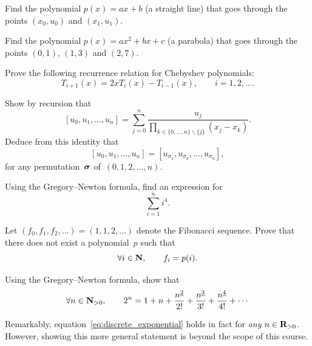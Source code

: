 
\begin{exercise}
    Find the polynomial $p(x) = ax + b$ (a straight line) that goes through the points $(x_0, u_0)$ and $(x_1, u_1)$.
\end{exercise}

\begin{exercise}
    Find the polynomial $p(x) = ax^2 + b x + c$ (a parabola) that goes through the points $(0, 1)$, $(1, 3)$ and $(2, 7)$.
\end{exercise}

\begin{exercise}
    Prove the following recurrence relation for Chebyshev polynomials:
    \[
        T_{i+1}(x) = 2 x T_i(x) - T_{i-1}(x), \qquad i = 1, 2, \dotsc.
    \]
\end{exercise}

\begin{exercise}
    \label{exercise:divided_differences}
    Show by recursion that
    \[
        [u_{0}, u_{1}, \dotsc, u_{n}] = \sum_{j=0}^{n} \frac{u_{j}}{\prod_{ k \in \{0, \dotsc, n\} \backslash \{ j\}} (x_{j} - x_{k})}.
    \]
    Deduce from this identity that
    \[
        [u_{0}, u_{1}, \dotsc, u_{n}] = [u_{\sigma_1}, u_{\sigma_2}, \dotsc, u_{\sigma_n}],
    \]
    for any permutation~$\mathbf{\boldsymbol{\sigma}}$ of~$(0, 1, 2, \dotsc, n)$.
\end{exercise}

\begin{exercise}
    Using the Gregory--Newton formula,
    find an expression for
    \[
        \sum_{i=1}^{n} i^4.
    \]
\end{exercise}

\begin{exercise}
    Let $(f_0, f_1, f_2, \dotsc) = (1, 1, 2, \dotsc)$ denote the Fibonacci sequence.
    Prove that there does not exist a polynomial~$p$ such that
    \[
        \forall i \in \mathbf N, \qquad
        f_i = p(i).
    \]
\end{exercise}

\begin{exercise}
    Using the Gregory--Newton formula,
    show that
    \begin{equation}
        \label{eq:discrete_exponential}
        \forall n \in \mathbf N_{>0},
        \qquad 2^n = 1 + n + \frac{n^{\underline{2}}}{2!} + \frac{n^{\underline 3}}{3!} + \frac{n^{\underline 4}}{4!} + \dotsb
    \end{equation}
    \begin{remark}
        Remarkably, equation~\eqref{eq:discrete_exponential} holds in fact for \emph{any} $n \in \mathbf R_{> 0}$.
        However, showing this more general statement is beyond the scope of this course.
    \end{remark}
\end{exercise}

